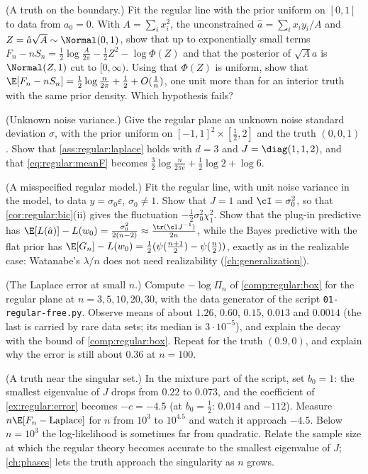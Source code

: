 \begin{refsection}
\begin{exercises}
\item \byhand (A truth on the boundary.) Fit the regular line with the prior uniform on $[0,1]$ to data from $a_0=0$. With $A=\sum_ix_i^2$, the unconstrained $\hat a=\sum_ix_iy_i/A$ and $Z=\hat a\sqrt A\sim\Normal(0,1)$, show that up to exponentially small terms $F_n-nS_n=\frac12\log\frac A{2\pi}-\frac12Z^2-\log\Phi(Z)$ and that the posterior of $\sqrt Aa$ is $\Normal(Z,1)$ cut to $[0,\infty)$. Using that $\Phi(Z)$ is uniform, show that $\E[F_n-nS_n]=\frac12\log\frac n{2\pi}+\frac12+O(\frac1n)$, one unit more than for an interior truth with the same prior density. Which hypothesis fails?\label{ex:regular:boundary}

\item \variation (Unknown noise variance.) Give the regular plane an unknown noise standard deviation $\sigma$, with the prior uniform on $[-1,1]^2\times[\frac12,2]$ and the truth $(0,0,1)$. Show that \cref{ass:regular:laplace} holds with $d=3$ and $J=\diag(1,1,2)$, and that \eqref{eq:regular:meanF} becomes $\frac32\log\frac n{2\pi e}+\frac12\log2+\log6$.\label{ex:regular:sigma}

\item \variation (A misspecified regular model.) Fit the regular line, with unit noise variance in the model, to data $y=\sigma_0\varepsilon$, $\sigma_0\ne1$. Show that $J=1$ and $\cI=\sigma_0^2$, so that \cref{cor:regular:bic}(ii) gives the fluctuation $-\frac12\sigma_0^2\chi^2_1$. Show that the plug-in predictive has $\E[L(\hat a)]-L(w_0)=\frac{\sigma_0^2}{2(n-2)}\approx\frac{\tr(\cI J^{-1})}{2n}$, while the Bayes predictive with the flat prior has $\E[G_n]-L(w_0)=\frac12(\psi(\frac{n+1}2)-\psi(\frac n2))$, exactly as in the realizable case: Watanabe's $\lambda/n$ does not need realizability (\cref{ch:generalization}).\label{ex:regular:misspec}

\item \measurement (The Laplace error at small $n$.) Compute $-\log\Pi_n$ of \cref{comp:regular:box} for the regular plane at $n=3,5,10,20,30$, with the data generator of the script \texttt{01-regular-free.py}. Observe means of about $1.26$, $0.60$, $0.15$, $0.013$ and $0.0014$ (the last is carried by rare data sets; its median is $3\cdot10^{-5}$), and explain the decay with the bound of \cref{comp:regular:box}. Repeat for the truth $(0.9,0)$, and explain why the error is still about $0.36$ at $n=100$.\label{ex:regular:small}

\item \measurement (A truth near the singular set.) In the mixture part of the script, set $b_0=1$: the smallest eigenvalue of $J$ drops from $0.22$ to $0.073$, and the coefficient of \cref{ex:regular:error} becomes $-c=-4.5$ (at $b_0=\frac12$: $0.014$ and $-112$). Measure $n\E[F_n-\text{Laplace}]$ for $n$ from $10^3$ to $10^{4.5}$ and watch it approach $-4.5$. Below $n=10^3$ the log-likelihood is sometimes far from quadratic. Relate the sample size at which the regular theory becomes accurate to the smallest eigenvalue of $J$; \cref{ch:phases} lets the truth approach the singularity as $n$ grows.\label{ex:regular:nearsing}


\end{exercises}
\end{refsection}
